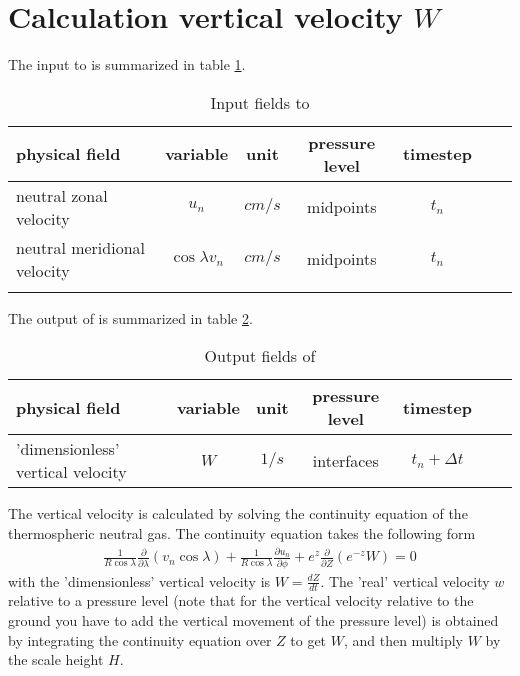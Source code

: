 %
\section{Calculation vertical velocity $W$ }\label{cap:divrg}
%
The input to  is summarized in table
\ref{tab:input_swdot}.
%
\begin{table}[tb]
\begin{tabular}{|p{3.5cm} ||c|c|c|c|c|c|} \hline
physical field               & variable        & unit&pressure
level& timestep
\\ \hline \hline
%
neutral zonal velocity &       $u_n$              & $cm/s$   &  midpoints & $t_n$\\
neutral meridional velocity &       $\cos \lambda v_n$              & $cm/s$   &  midpoints & $t_n$\\
 \\ \hline
\end{tabular}
\caption{Input fields to }
\label{tab:input_swdot}
\end{table}
%
The output of  is summarized in table
\ref{tab:output_swdot}.
%
\begin{table}[tb]
\begin{tabular}{|p{3.5cm} ||c|c|c|c|c|c|} \hline
physical field               & variable        & unit&pressure
level& timestep \\ \hline \hline 'dimensionless' vertical velocity &
$W$ & $1/s$ & interfaces  & $t_n+\Delta t$
\\ \hline \hline
\end{tabular}
\caption{Output fields of }
\label{tab:output_swdot}
\end{table}
%
The vertical velocity is calculated by solving the continuity
equation of the
thermospheric neutral gas. The continuity equation takes the
following form
%
\begin{align}
  \frac{1}{R \cos \lambda} \frac{\partial}{\partial \lambda} ( v_n \cos \lambda
 ) + \frac{1}{R \cos \lambda } \frac{\partial u_n}{\partial
  \phi} + e^z \frac{\partial}{\partial Z}(e^{-z}W) = 0 \label{eq:swdot1}
\end{align}
%
with the 'dimensionless' vertical velocity is $W= \frac{dZ}{dt}$.
The 'real' vertical velocity $w$ relative to a pressure level 
(note that for the vertical velocity relative to the ground you have to add the
vertical movement of the pressure level) is obtained by integrating the
continuity equation over $Z$ to get $W$, and then multiply $W$ by
the scale height $H$. \\


